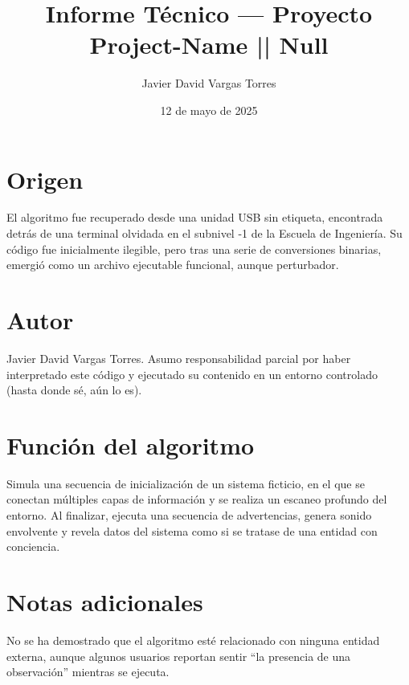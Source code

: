 \documentclass{article}
\title{Informe Técnico — Proyecto {Project-Name || Null}}
\author{Javier David Vargas Torres}
\date{12 de mayo de 2025}
\begin{document}
\maketitle

\section*{Origen}

El algoritmo fue recuperado desde una unidad USB sin etiqueta, encontrada detrás de una terminal olvidada en el subnivel -1 de la Escuela de Ingeniería. Su código fue inicialmente ilegible, pero tras una serie de conversiones binarias, emergió como un archivo ejecutable funcional, aunque perturbador.

\section*{Autor}

Javier David Vargas Torres. Asumo responsabilidad parcial por haber interpretado este código y ejecutado su contenido en un entorno controlado (hasta donde sé, aún lo es).

\section*{Función del algoritmo}

Simula una secuencia de inicialización de un sistema ficticio, en el que se conectan múltiples capas de información y se realiza un escaneo profundo del entorno. Al finalizar, ejecuta una secuencia de advertencias, genera sonido envolvente y revela datos del sistema como si se tratase de una entidad con conciencia.

\section*{Notas adicionales}

No se ha demostrado que el algoritmo esté relacionado con ninguna entidad externa, aunque algunos usuarios reportan sentir “la presencia de una observación” mientras se ejecuta.
\end{document}
